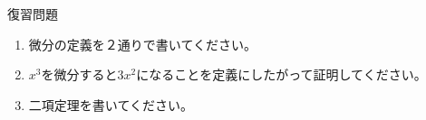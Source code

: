 \documentclass[12pt,a4paper]{jsarticle}
\begin{document}
復習問題
\begin{enumerate}
    \item 微分の定義を２通りで書いてください。
    \item $x^3$を微分すると$3x^2$になることを定義にしたがって証明してください。
    \item 二項定理を書いてください。
\end{enumerate}
\end{document}
